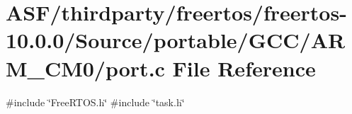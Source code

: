 \hypertarget{thirdparty_2freertos_2freertos-10_80_80_2_source_2portable_2_g_c_c_2_a_r_m___c_m0_2port_8c}{}\section{A\+S\+F/thirdparty/freertos/freertos-\/10.0.0/\+Source/portable/\+G\+C\+C/\+A\+R\+M\+\_\+\+C\+M0/port.c File Reference}
\label{thirdparty_2freertos_2freertos-10_80_80_2_source_2portable_2_g_c_c_2_a_r_m___c_m0_2port_8c}
{\ttfamily \#include \char`\"{}Free\+R\+T\+O\+S.\+h\char`\"{}}\newline
{\ttfamily \#include \char`\"{}task.\+h\char`\"{}}\newline
